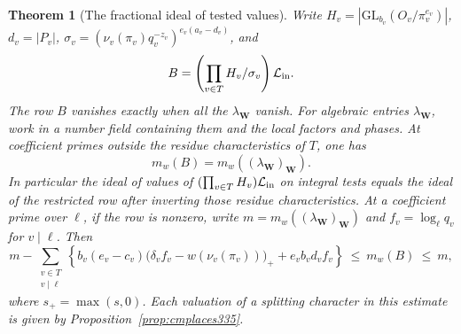 \documentclass[a4paper,11pt]{article}
\newtheorem{theorem}[proposition]{Theorem}
\theoremstyle{definition}
\theoremstyle{remark}
\numberwithin{equation}{section}
\begin{document}
\begin{theorem}[The fractional ideal of tested values]\label{thm:rowcontent335}
Write \(H_v=|\mathrm{GL}_{b_v}(O_v/\pi_v^{e_v})|\),
\(d_v=|P_v|\), \(\sigma_v=(\nu_v(\pi_v)q_v^{-z_v})^{e_v(a_v-d_v)}\),
and
\[
                  B=\left(\prod_{v\in T}H_v/\sigma_v\right)
                             \mathcal L_{\rm in}.
\]
The row \(B\) vanishes exactly when all the \(\lambda_{\mathbf W}\) vanish. For algebraic entries
\(\lambda_{\mathbf W}\), work in a number field containing them and
the local factors and phases. At coefficient primes outside
the residue characteristics of \(T\), one has
\[
                 m_w(B)=m_w((\lambda_{\mathbf W})_{\mathbf W}).
\]
In particular the ideal of values of
\((\prod_{v\in T}H_v)\mathcal L_{\rm in}\) on integral tests equals
the ideal of the restricted row after inverting those residue
characteristics. At a coefficient prime over \(\ell\), if the row is
nonzero, write \(m=m_w((\lambda_{\mathbf W})_{\mathbf W})\) and
\(f_v=\log_\ell q_v\) for \(v\mid\ell\). Then
\[
 m-\sum_{\substack{v\in T\\v\mid\ell}}
 \left\{b_v(e_v-c_v)
       \bigl(\delta_v f_v-w(\nu_v(\pi_v))\bigr)_+
                  +e_v b_v d_v f_v\right\}
        \ \le\ m_w(B)\ \le\ m ,
\]
where \(s_+=\max(s,0)\). Each valuation of a splitting character
in this estimate is given by Proposition~\ref{prop:cmplaces335}.
\end{theorem}
\end{document}
